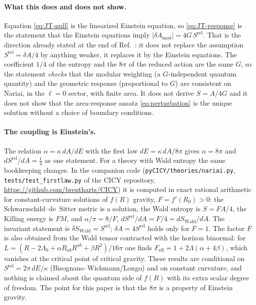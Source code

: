 \documentclass[11pt]{article}
\newcommand{\Srel}{S^{\mathrm{rel}}}
\begin{document}
\paragraph{What this does and does not show.} Equation \eqref{eq:JT-null} is the linearized Einstein equation, so \eqref{eq:JT-response} is the statement that the Einstein equations imply $|\delta A_{\mathrm{mod}}|=4G\,\Srel$. That is the direction already stated at the end of Ref.~\cite{DorauMuch}: it does not replace the assumption $\Srel=\delta A/4$ by anything weaker, it replaces it by the Einstein equations. The coefficient $1/4$ of the entropy and the $8\pi$ of the reduced action are the same $G$, so the statement \emph{checks} that the modular weighting (a $G$-independent quantum quantity) and the geometric response (proportional to $G$) are consistent on Nariai, in the $\ell=0$ sector, with finite area. It does not derive $S=A/4G$ and it does not show that the area-response ansatz \eqref{eq:perturbation} is the unique solution without a choice of boundary conditions.

\paragraph{The coupling is Einstein's.} The relation $\alpha=\kappa\,dA/dE$ with the first law $dE=\kappa\,dA/8\pi$ gives $\alpha=8\pi$ and $d\Srel/dA=\tfrac14$ as one statement. For a theory with Wald entropy the same bookkeeping changes. In the companion code (\texttt{pyCICY/theories/nariai.py}, \texttt{tests/test\_firstlaw.py} of the CICY repository, \url{https://github.com/brentharts/CICY}) it is computed in exact rational arithmetic for constant-curvature solutions of $f(R)$ gravity, $F=f'(R_0)>0$: the Schwarzschild--de~Sitter metric is a solution, the Wald entropy is $S=FA/4$, the Killing energy is $F M$, and $\alpha/\pi=8/F$, $d\Srel/dA=F/4=dS_{\mathrm{Wald}}/dA$. The invariant statement is $\delta S_{\mathrm{Wald}}=\Srel$; $\delta A=4\Srel$ holds only for $F=1$. The factor $F$ is also obtained from the Wald tensor contracted with the horizon binormal: for $L=(R-2\Lambda_0+\alpha R_{ab}R^{ab}+\beta R^2)/16\pi$ one finds $F_{\mathrm{eff}}=1+2\Lambda(\alpha+4\beta)$, which vanishes at the critical point of critical gravity. These results are conditional on $\Srel=2\pi\,dE/\kappa$ (Bisognano--Wichmann/Longo) and on constant curvature, and nothing is claimed about the quantum side of $f(R)$ with its extra scalar degree of freedom. The point for this paper is that the $8\pi$ is a property of Einstein gravity.
\end{document}
